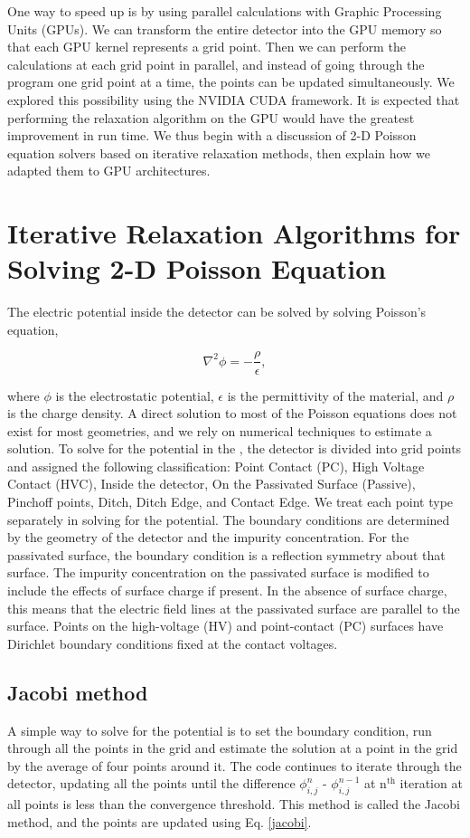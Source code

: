 One way to speed up {\ehd} is by using parallel calculations with Graphic Processing Units (GPUs). We can transform the entire detector into the GPU memory so that each GPU kernel represents a grid point. Then we can perform the calculations at each grid point in parallel, and instead of going through the program one grid point at a time, the points can be updated simultaneously. We explored this possibility using the NVIDIA CUDA {\cpp} framework. It is expected that performing the relaxation algorithm on the GPU would have the greatest improvement in run time. We thus begin with a discussion of 2-D Poisson equation solvers based on iterative relaxation methods, then explain how we adapted them to GPU architectures.

\section{Iterative Relaxation Algorithms for Solving 2-D Poisson Equation}
\label{ch4_sec_relax_algo}
The electric potential inside the detector can be solved by solving Poisson’s equation,

\begin{equation}
    \nabla^2 \phi= -\frac{\rho}{\epsilon},
\end{equation}

where $\phi$ is the electrostatic potential, $\epsilon$ is the permittivity of the material, and $\rho$ is the charge density. A direct solution to most of the Poisson equations does not exist for most geometries, and we rely on numerical techniques to estimate a solution. To solve for the potential in the {\ehd}, the detector is divided into grid points and assigned the following classification: Point Contact (PC), High Voltage Contact (HVC), Inside the detector, On the Passivated Surface (Passive), Pinchoff points, Ditch, Ditch Edge, and Contact Edge. We treat each point type separately in solving for the potential. The boundary conditions are determined by the geometry of the detector and the impurity concentration. For the passivated surface, the boundary condition is a reflection symmetry about that surface. The impurity concentration on the passivated surface is modified to include the effects of surface charge if present. In the absence of surface charge, this means that the electric field lines at the passivated surface are parallel to the surface. Points on the high-voltage (HV) and point-contact (PC) surfaces have Dirichlet boundary conditions fixed at the contact voltages.

\subsection*{Jacobi method}
A simple way to solve for the potential is to set the boundary condition, run through all the points in the grid and estimate the solution at a point in the grid by the average of four points around it. The code continues to iterate through the detector, updating all the points until the difference $\phi_{i,j}^{n}$ - $\phi_{i,j}^{n-1}$ at n$^{\text{th}}$ iteration at all points is less than the convergence threshold. This method is called the Jacobi method, and the points are updated using Eq. \ref{jacobi}.

